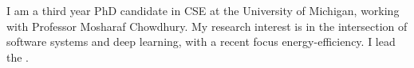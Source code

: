 

\begin{cvparagraph}

I am a third year PhD candidate in CSE at the University of Michigan, working with Professor Mosharaf Chowdhury.
My research interest is in the intersection of software systems and deep learning, with a recent focus energy-efficiency.
I lead the \href{https://ml.energy}{}.
\end{cvparagraph}
